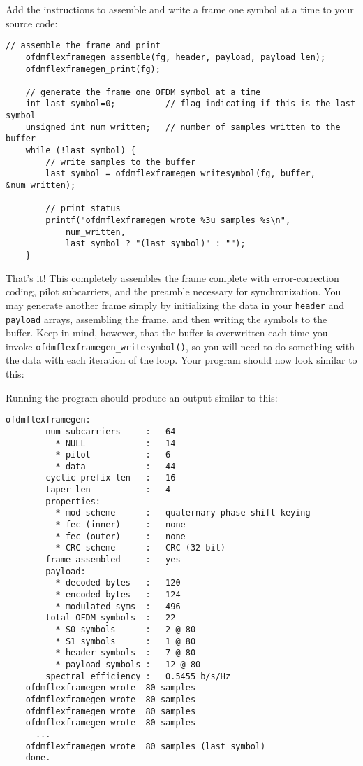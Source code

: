 Add the instructions to assemble and write a frame one symbol at a time
to your source code:
%
\begin{Verbatim}[fontsize=\small]
    // assemble the frame and print
    ofdmflexframegen_assemble(fg, header, payload, payload_len);
    ofdmflexframegen_print(fg);

    // generate the frame one OFDM symbol at a time
    int last_symbol=0;          // flag indicating if this is the last symbol
    unsigned int num_written;   // number of samples written to the buffer
    while (!last_symbol) {
        // write samples to the buffer
        last_symbol = ofdmflexframegen_writesymbol(fg, buffer, &num_written);

        // print status
        printf("ofdmflexframegen wrote %3u samples %s\n",
            num_written,
            last_symbol ? "(last symbol)" : "");
    }
\end{Verbatim}
%
That's it!
This completely assembles the frame complete with error-correction
coding, pilot subcarriers, and the preamble necessary for
synchronization.
You may generate another frame simply by
  initializing the data in your {\tt header} and {\tt payload} arrays,
  assembling the frame,
  and then writing the symbols to the buffer.
Keep in mind, however, that the buffer is overwritten each time you
invoke {\tt ofdmflexframegen\_writesymbol()},
so you will need to do something with the data with each iteration of
the loop.
%
Your program should now look similar to this:
%

%
Running the program should produce an output similar to this:
%
\begin{Verbatim}[fontsize=\small]
    ofdmflexframegen:
        num subcarriers     :   64
          * NULL            :   14
          * pilot           :   6
          * data            :   44
        cyclic prefix len   :   16
        taper len           :   4
        properties:
          * mod scheme      :   quaternary phase-shift keying
          * fec (inner)     :   none
          * fec (outer)     :   none
          * CRC scheme      :   CRC (32-bit)
        frame assembled     :   yes
        payload:
          * decoded bytes   :   120
          * encoded bytes   :   124
          * modulated syms  :   496
        total OFDM symbols  :   22
          * S0 symbols      :   2 @ 80
          * S1 symbols      :   1 @ 80
          * header symbols  :   7 @ 80
          * payload symbols :   12 @ 80
        spectral efficiency :   0.5455 b/s/Hz
    ofdmflexframegen wrote  80 samples 
    ofdmflexframegen wrote  80 samples 
    ofdmflexframegen wrote  80 samples 
    ofdmflexframegen wrote  80 samples 
      ...
    ofdmflexframegen wrote  80 samples (last symbol)
    done.
\end{Verbatim}
